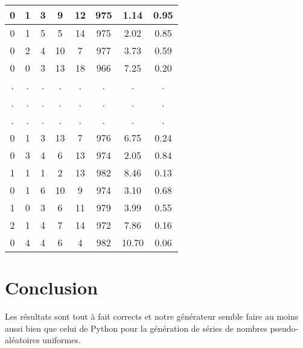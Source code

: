 \documentclass[12pt,a4paper]{article}
\begin{document}
\begin{center}
\begin{tabular}{|c|c|c|c|c|c|c|c|}
0 & 1 & 3 & 9 & 12 & 975 &  1.14 &  0.95\\ \hline
0 & 1 & 5 & 5 & 14 & 975 &  2.02 &  0.85\\ \hline
0 & 2 & 4 & 10 & 7 & 977 &  3.73 &  0.59\\ \hline
0 & 0 & 3 & 13 & 18 & 966 &  7.25 &  0.20\\ \hline
 . & . & . & . & . & . & . & .\\ \hline
 . & . & . & . & . & . & . & .\\ \hline
 . & . & . & . & . & . & . & .\\ \hline
0 & 1 & 3 & 13 & 7 & 976 &  6.75 &  0.24\\ \hline
0 & 3 & 4 & 6 & 13 & 974 &  2.05 &  0.84\\ \hline
1 & 1 & 1 & 2 & 13 & 982 &  8.46 &  0.13\\ \hline
0 & 1 & 6 & 10 & 9 & 974 &  3.10 &  0.68\\ \hline
1 & 0 & 3 & 6 & 11 & 979 &  3.99 &  0.55\\ \hline
2 & 1 & 4 & 7 & 14 & 972 &  7.86 &  0.16\\ \hline
0 & 4 & 4 & 6 & 4 & 982 & 10.70 &  0.06\\ \hline
\end{tabular}
\end{center}


\section{Conclusion}
Les résultats sont tout à fait corrects et notre générateur semble faire
au moins aussi bien que celui de Python pour la génération de séries de nombres
pseudo-aléatoires uniformes.
\end{document}
